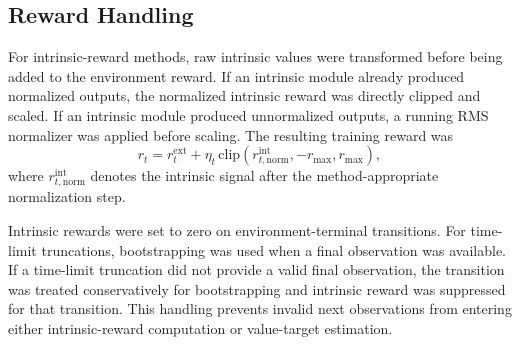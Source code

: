 \subsection{Reward Handling}
\label{subsec:methodology_reward_handling}

For intrinsic-reward methods, raw intrinsic values were transformed before being added to the environment reward.
If an intrinsic module already produced normalized outputs, the normalized intrinsic reward was directly clipped and scaled.
If an intrinsic module produced unnormalized outputs, a running RMS normalizer was applied before scaling.
The resulting training reward was
\begin{equation}
    r_t=r_t^{\mathrm{ext}}+\eta_t\,\mathrm{clip}\!\left(r_{t,\mathrm{norm}}^{\mathrm{int}},-r_{\max},r_{\max}\right),
\end{equation}
where $r_{t,\mathrm{norm}}^{\mathrm{int}}$ denotes the intrinsic signal after the method-appropriate normalization step.

Intrinsic rewards were set to zero on environment-terminal transitions.
For time-limit truncations, bootstrapping was used when a final observation was available.
If a time-limit truncation did not provide a valid final observation, the transition was treated conservatively for bootstrapping and intrinsic reward was suppressed for that transition.
This handling prevents invalid next observations from entering either intrinsic-reward computation or value-target estimation.